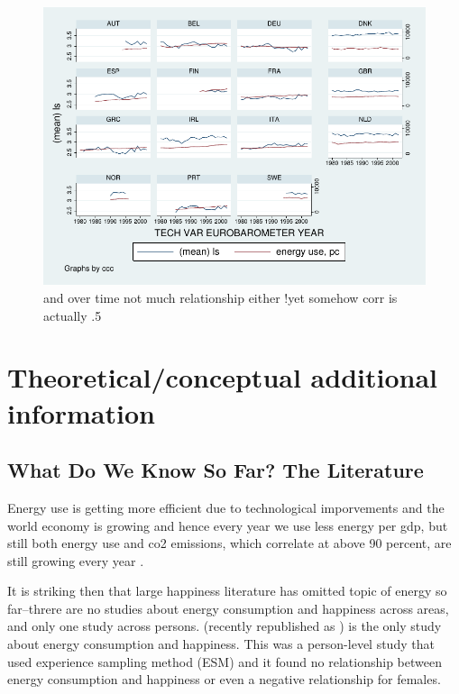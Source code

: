 \documentclass[10pt, letterpaper]{article}
\begin{document}
\begin{spacing}{1.4}
\begin{figure}[H]
 \includegraphics[width=6in]{graphsAndTables/ebTS.pdf}\centering
\caption{and over time not much relationship either !yet somehow corr is actually .5 }\label{ebTS}
\end{figure}


\section{Theoretical/conceptual additional information}

\subsection{What Do We Know So Far? The Literature}


Energy use is getting more efficient due to technological imporvements and the
world economy is growing and hence every year we use less energy per gdp, but
still both energy use and co2 emissions, which correlate at above 90 percent,
are still growing every year \cite{iea14}. 


It is striking then that large happiness literature has omitted topic of energy
so far--threre are no studies about energy consumption and happiness across
areas, and only one study across persons.  \cite{graef81} (recently republished
as \cite{csikszentmihalyi14}) is the  only study about energy consumption and
happiness. This was a person-level study that used experience
sampling method (ESM) and it found no relationship between energy consumption
and happiness or even a negative relationship for females. 


\end{spacing}
\end{document}
